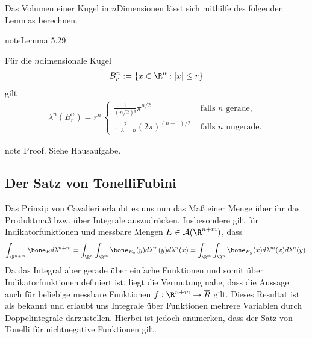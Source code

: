 \documentclass[letterpaper,10pt,german]{jupyterBook}
\begin{document}
\sphinxAtStartPar
Das Volumen einer Kugel in \(n\)\sphinxhyphen{}Dimensionen lässt sich mithilfe des folgenden Lemmas berechnen.
\label{masstheorie/integrationstechnik:lemma-21}
\begin{sphinxadmonition}{note}{Lemma 5.29}



\sphinxAtStartPar
Für die \(n\)\sphinxhyphen{}dimensionale Kugel
\begin{equation*}
\begin{split}B_r^n:=\{x\in\R^n: |x|\leq r\}\end{split}
\end{equation*}
\sphinxAtStartPar
gilt
\begin{equation*}
\begin{split}\lambda^n(B_r^n) =
r^n\,
\begin{cases}
\frac{1}{(n/2)!} \pi^{n/2}&\text{ falls }n \text{ gerade,}\\
\frac{2}{1\cdot 3\cdot\ldots n} (2\pi)^{(n-1)/2}&\text{ falls }n \text{ ungerade.}
\end{cases}\end{split}
\end{equation*}\end{sphinxadmonition}

\begin{sphinxadmonition}{note}
\sphinxAtStartPar
Proof. Siehe Hausaufgabe.
\end{sphinxadmonition}


\subsection{Der Satz von Tonelli\sphinxhyphen{}Fubini}
\label{\detokenize{masstheorie/integrationstechnik:der-satz-von-tonelli-fubini}}
\sphinxAtStartPar
Das Prinzip von Cavalieri erlaubt es uns nun das Maß einer Menge über ihr das Produktmaß bzw. über Integrale auszudrücken. Insbesondere gilt für Indikatorfunktionen und messbare Mengen \(E\in\mathcal{A}(\R^{n+m})\), dass
\begin{equation*}
\begin{split}\int_{\R^{n+m}} \bone_E d\lambda^{n+m} = \int_{\R^{n}} \int_{\R^{m}} \bone_{E_x}(y) d\lambda^m(y)d\lambda^n(x) =
\int_{\R^{m}} \int_{\R^{n}} \bone_{E_y}(x) d\lambda^m(x)d\lambda^n(y).\end{split}
\end{equation*}
\sphinxAtStartPar
Da das Integral aber gerade über einfache Funktionen und somit über Indikatorfunktionen definiert ist, liegt die Vermutung nahe, dass die Aussage auch für beliebige messbare Funktionen \(f:\R^{n+m}\to\overline{R}\) gilt. Dieses Resultat ist als  bekannt und erlaubt uns Integrale über Funktionen mehrere Variablen durch Doppelintegrale darzustellen. Hierbei ist jedoch anumerken, dass der Satz von Tonelli  für nicht\sphinxhyphen{}negative Funktionen gilt.
\end{document}
